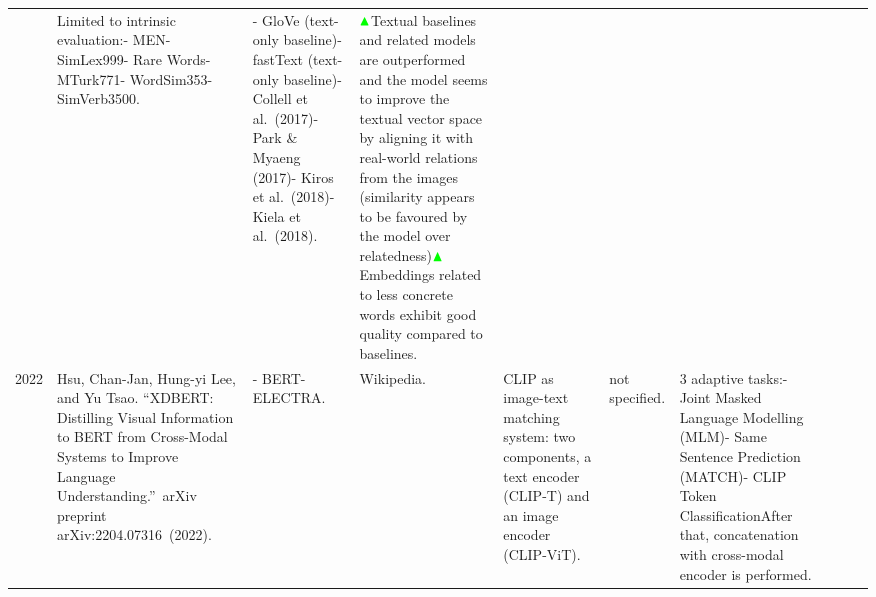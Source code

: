 \documentclass[
]{krantz}
\begin{document}
\begin{longtable}[]{@{}llllllllll@{}}
\begin{minipage}[t]{0.25\columnwidth}
\end{minipage} & \begin{minipage}[t]{0.08\columnwidth}\raggedright
Limited to intrinsic evaluation:- MEN- SimLex999- Rare Words- MTurk771- WordSim353- SimVerb3500.\strut
\end{minipage} & \begin{minipage}[t]{0.05\columnwidth}\raggedright
- GloVe (text-only baseline)- fastText (text-only baseline)- Collell et al.~(2017)- Park \& Myaeng (2017)- Kiros et al.~(2018)- Kiela et al.~(2018).\strut
\end{minipage} & \begin{minipage}[t]{0.13\columnwidth}\raggedright
\(\color{green}\blacktriangle\)Textual baselines and related models are outperformed and the model seems to improve the textual vector space by aligning it with real-world relations from the images (similarity appears to be favoured by the model over relatedness)\(\color{green}\blacktriangle\)Embeddings related to less concrete words exhibit good quality compared to baselines.\strut
\end{minipage}\tabularnewline
\begin{minipage}[t]{0.00\columnwidth}\raggedright
2022\strut
\end{minipage} & \begin{minipage}[t]{0.06\columnwidth}\raggedright
Hsu, Chan-Jan, Hung-yi Lee, and Yu Tsao. ``XDBERT: Distilling Visual Information to BERT from Cross-Modal Systems to Improve Language Understanding.''~arXiv preprint arXiv:2204.07316~(2022).\strut
\end{minipage} & \begin{minipage}[t]{0.04\columnwidth}\raggedright
- BERT- ELECTRA.\strut
\end{minipage} & \begin{minipage}[t]{0.02\columnwidth}\raggedright
Wikipedia.\strut
\end{minipage} & \begin{minipage}[t]{0.07\columnwidth}\raggedright
CLIP as image-text matching system: two components, a text encoder (CLIP-T) and an image encoder (CLIP-ViT).\strut
\end{minipage} & \begin{minipage}[t]{0.05\columnwidth}\raggedright
not specified.\strut
\end{minipage} & \begin{minipage}[t]{0.25\columnwidth}\raggedright
3 adaptive tasks:- Joint Masked Language Modelling (MLM)- Same Sentence Prediction (MATCH)- CLIP Token ClassificationAfter that, concatenation with cross-modal encoder is performed.\strut

\end{minipage}
\end{longtable}
\end{document}
